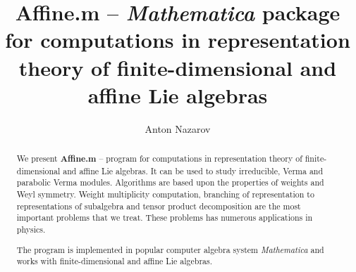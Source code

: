 \documentclass[preprint,12pt]{elsarticle}
\begin{document}
\begin{frontmatter}



\title{{\bf Affine.m} -- {\it Mathematica} package for computations in representation theory of finite-dimensional and affine Lie algebras}


\author[a,b]{Anton Nazarov}

\address[a]{Department of High Energy Physics, Faculty of physics, SPb State University\\ 198904, Sankt-Petersburg, Russia}
\address[b]{Chebyshev Laboratory, Faculty of Mathematics and Mechanics, SPb State University\\ 199178, Saint-Petersburg, Russia}

\begin{abstract}
We present {\bf Affine.m} -- program for computations in representation theory of finite-dimensional and affine Lie algebras. It can be used to study irreducible, Verma and parabolic Verma modules. Algorithms are based upon the properties of weights and Weyl symmetry. Weight multiplicity computation, branching of representation to representations of subalgebra and tensor product decomposition are the most important problems that we treat. These problems has numerous applications in physics. 

The program is implemented in popular  computer algebra system {\it Mathematica} and works with finite-dimensional and affine Lie algebras.


\end{abstract}
\end{frontmatter}
\end{document}
